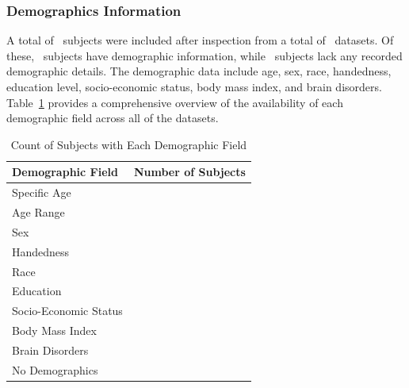 \subsubsection{Demographics Information}

A total of \TotalSubjectsIncludedAfterInspectionCount\ subjects were included after inspection 
from a total of \NumDatasets\ datasets. Of these, \TotalSubjectsWithDemographicsInfoCount\ subjects 
have demographic information, while \TotalSubjectsWithoutDemographicsInfoCount\ 
subjects lack any recorded demographic details. The demographic data include age, sex, race, handedness, education level, 
socio-economic status, body mass index, and brain disorders. Table~\ref{DemographicsOverviewTable} provides a comprehensive 
overview of the availability of each demographic field across all of the datasets.



\begin{table}[h!]
    \centering
    \begin{threeparttable}
        \caption{Count of Subjects with Each Demographic Field}
        \label{DemographicsOverviewTable}
        \setlength{\tabcolsep}{45pt}%
        
        \begin{tabular}{@{}ll}
            \toprule
            \textbf{Demographic Field} & \textbf{Number of Subjects} \\
            \midrule
            Specific Age & \TotalSubjectsWithAgeCount\ \\
            Age Range & \TotalSubjectsWithAgeGroupCount\ \\
            Sex & \TotalSubjectsWithSexCount\ \\
            Handedness & \TotalSubjectsWithHandednessCount\ \\
            Race & \TotalSubjectsWithRaceCount\ \\
            Education & \TotalSubjectsWithEducationCount\ \\
            Socio-Economic Status & \TotalSubjectsWithSocioEconomicCount\ \\
            Body Mass Index & \TotalSubjectsWithBodyMassIndexCount\ \\
            Brain Disorders & \TotalSubjectsWithDisordersCount\ \\
            No Demographics & \TotalSubjectsWithoutDemographicsInfoCount\ \\
            \bottomrule
        \end{tabular}
        
    \end{threeparttable}
\end{table}


